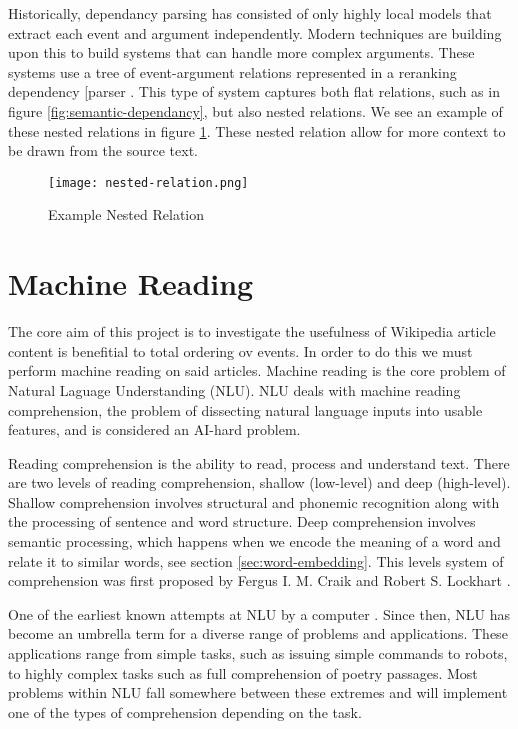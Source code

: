 \documentclass[bsc,frontabs,twoside,singlespacing,parskip,deptreport]{infthesis}     %
\begin{document}
Historically, dependancy parsing has consisted of only highly local models that extract each event and argument independently.
Modern techniques are building upon this to build systems that can handle more complex arguments. These systems use a tree of
event-argument relations represented in a reranking dependency [parser \cite{mcclosky2011event}.
This type of system captures both flat relations, such as in figure \ref{fig:semantic-dependancy}, but also nested relations.
We see an example of these nested relations in figure \ref{fig:nested-relation}. These nested relation allow for more context to be drawn from
the source text.

\begin{figure}[H]
  \centering
  \texttt{[image: nested-relation.png]}
  \caption{Example Nested Relation}
  \label{fig:nested-relation}
\end{figure}


\section{Machine Reading}
The core aim of this project is to investigate the usefulness of Wikipedia article content is benefitial to total ordering ov events.
In order to do this we must perform machine reading on said articles.
Machine reading is the core problem of Natural Laguage Understanding (NLU).
NLU deals with machine reading comprehension, the problem of dissecting natural language inputs into usable features,
and is considered an AI-hard problem.

Reading comprehension is the ability to read, process and understand text.  
There are two levels of reading comprehension, shallow (low-level) and deep (high-level).
Shallow comprehension involves structural and phonemic recognition along with the processing of sentence and  word
structure.
Deep comprehension involves semantic processing, which happens when we encode the meaning of a word and relate it
to similar words, see section \ref{sec:word-embedding}.
This levels system of comprehension was first proposed by  Fergus I. M. Craik and Robert S. Lockhart \cite{wagner2009beyond}.

One of the earliest known attempts at NLU by a computer \cite{russell1995modern}. Since then, NLU has become an
umbrella term for a diverse range of problems and applications. These applications range from simple tasks, such as
issuing simple commands to robots, to highly complex tasks such as full comprehension of poetry passages.
Most problems within NLU fall somewhere between these extremes and will implement one of the types of comprehension
depending on the task.
\end{document}
